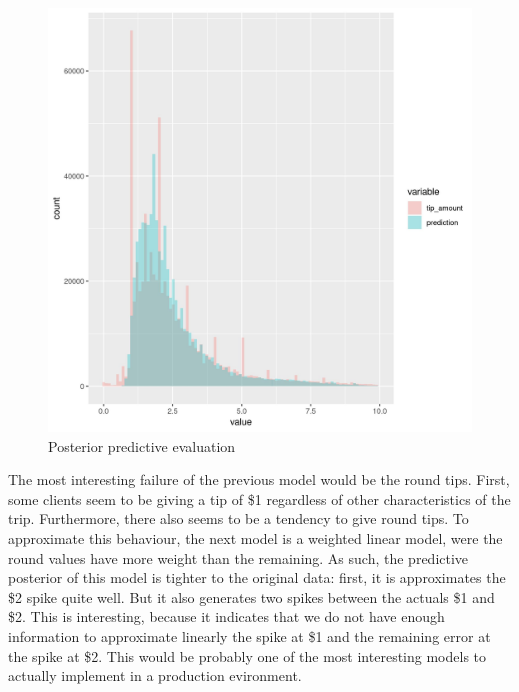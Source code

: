 \documentclass[11pt]{article}
\begin{document}
\begin{figure}[htbp]
\centering
\includegraphics[width=.9\linewidth]{./plots/evaluation1PosteriorPredictive.jpg}
\caption{\label{fig:orge2c38e9}
Posterior predictive evaluation}
\end{figure}

The most interesting failure of the previous model would be the round tips.
First, some clients seem to be giving a tip of \$1 regardless of other
characteristics of the trip. Furthermore, there also seems to be a tendency
to give round tips.
To approximate this behaviour, the next model is a weighted linear model,
were the round values have more weight than the remaining. As such, the
predictive posterior of this model is tighter to the original data:
first, it is approximates the \$2 spike quite well.
But it also generates two spikes between the actuals \$1 and \$2. This is
interesting, because it indicates that we do not have enough information
to approximate linearly the spike at \$1 and the remaining error at the
spike at \$2. This would be probably one of the most interesting models to
actually implement in a production evironment.
\end{document}
